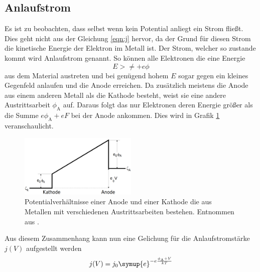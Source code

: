 \subsection{Anlaufstrom}
Es ist zu beobachten, dass selbst wenn kein Potential anliegt ein Strom fließt.
Dies geht nicht aus der Gleichung \eqref{eqn:j} hervor, da der Grund für diesen Strom die kinetische Energie der Elektron im Metall ist.
Der Strom, welcher so zustande kommt wird Anlaufstrom genannt.
So können alle Elektronen die eine Energie
\begin{equation*}
    E > \ne + e\phi
\end{equation*}
aus dem Material austreten und bei genügend hohem $E$ sogar gegen ein kleines Gegenfeld anlaufen und die Anode erreichen.
Da zusätzlich meistens die Anode aus einem anderen Metall als die Kathode besteht, weist sie eine andere Austrittsarbeit $\phi_\text{A}$ auf.
Daraus folgt das nur Elektronen deren Energie größer als die Summe $e\phi_\text{A}+eF$ bei der Anode ankommen.
Dies wird in Grafik \ref{fig:potential} veranschaulicht.
\begin{figure}
    \centering
    \includegraphics[width=0.5\textwidth]{content/data/potential.png}
    \caption{Potentialverhältnisse einer Anode und einer Kathode die aus Metallen mit verschiedenen Austrittsarbeiten bestehen. Entnommen aus \cite[8]{anleitung}.}
    \label{fig:potential}
\end{figure}
Aus diesem Zusammenhang kann nun eine Gelichung für die Anlaufstromstärke $j(V)$ aufgestellt werden
\begin{equation*}
    j(V) = j_0 \symup{e}^{-e\frac{\phi_\text{A}+V}{kT}}
\end{equation*}

